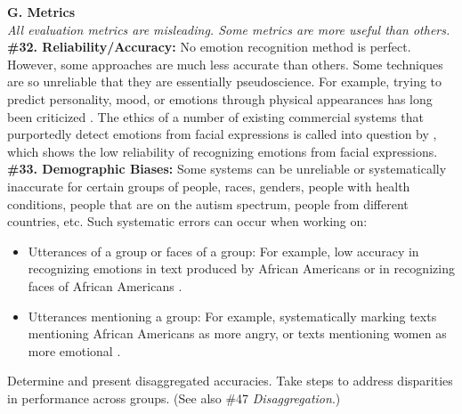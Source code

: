 \documentclass{clv3}
\begin{document}
\noindent \textbf{G. Metrics}\\ [2pt]
\noindent \textit{All evaluation metrics are misleading. Some metrics are more useful than others.}\\[-2pt]

\noindent \textbf{\#32. Reliability/Accuracy:} No emotion recognition method is perfect. However, some approaches are much less accurate than others. 
Some techniques are so unreliable that they are essentially pseudoscience. For example, trying to predict personality, mood, or emotions through physical appearances has long been criticized \cite{physiognomy_2017}. 
The ethics of a number of existing commercial systems that purportedly detect emotions from facial expressions is called into question
 by \citet{barrett2019emotional}, which shows the low reliability of recognizing emotions from facial expressions.\\


\noindent \textbf{\#33. Demographic Biases:} Some systems can be unreliable or systematically inaccurate for certain groups of people, races, genders, people with health conditions, people that are on the autism spectrum, people from different countries, etc. Such systematic errors can occur when working on:\\[-20pt]
\begin{itemize}
    \item Utterances of a group or faces of a group: For example, low accuracy in recognizing emotions in text produced by African Americans or in recognizing faces of African Americans \cite{buolamwini2018gender}.
    \item Utterances mentioning a group: For example, systematically marking texts mentioning African Americans as more angry, or texts mentioning women as more emotional \cite{kiritchenko-mohammad-2018-examining}.
\end{itemize}
\vspace*{-3mm}
\noindent Determine and present disaggregated accuracies. Take steps to address disparities in performance across groups. (See also \#47 \textit{Disaggregation}.)\\
\end{document}
